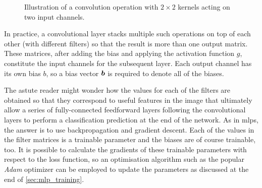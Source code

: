 \documentclass[../report.tex]{subfiles}
\begin{document}
\begin{figure}
    \caption[Illustration of a convolution operation acting on two input channels.]{Illustration of a convolution operation with $2\times 2$ kernels acting on two input channels.}
    \label{fig:conv_multiple_channels}
\end{figure}
In practice, a convolutional layer stacks multiple such operations on top of each other (with different filters) so that the result is more than one output matrix.
These matrices, after adding the bias and applying the activation function $g$, constitute the input channels for the subsequent layer.
Each output channel has its own bias $b$, so a bias vector ${\bm{b}}$ is required to denote all of the biases.

The astute reader might wonder how the values for each of the filters are obtained so that they correspond to useful features in the image that ultimately allow a series of fully-connected feedforward layers following the convolutional layers to perform a classification prediction at the end of the network.
As in \glspl{mlp}, the answer is to use backpropagation and gradient descent.
Each of the values in the filter matrices is a trainable parameter and the biases are of course trainable, too.
It is possible to calculate the gradients of these trainable parameters with respect to the loss function, so an optimisation algorithm such as the popular \emph{Adam} optimizer \cite{kingma2017} can be employed to update the parameters as discussed at the end of \cref{sec:mlp_training}.
\end{document}
